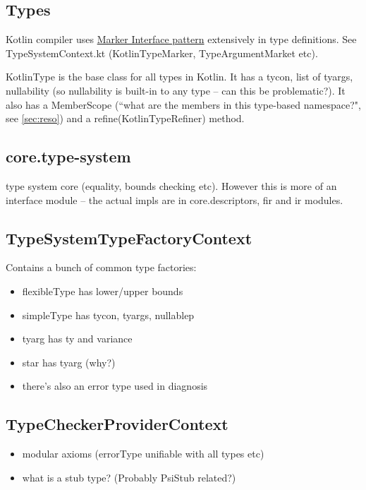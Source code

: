 \documentclass{article}
\begin{document}
\subsection{Types}

Kotlin compiler uses \href{https://en.wikipedia.org/wiki/Marker_interface_pattern}{Marker Interface pattern} extensively in type definitions. See TypeSystemContext.kt (KotlinTypeMarker, TypeArgumentMarket etc).

KotlinType is the base class for all types in Kotlin. It has a tycon, list of tyargs, nullability (so nullability is built-in to any type -- can this be problematic?). It also has a MemberScope (``what are the members in this type-based namespace?", see \ref{sec:reso}) and a refine(KotlinTypeRefiner) method.

\subsection{core.type-system}

type system core (equality, bounds checking etc). However this is more of an interface module -- the actual impls are in core.descriptors, fir and ir modules.

\subsection{TypeSystemTypeFactoryContext}

Contains a bunch of common type factories:

\begin{itemize}
    \item flexibleType has lower/upper bounds
    \item simpleType has tycon, tyargs, nullablep
    \item tyarg has ty and variance
    \item star has tyarg (why?)
    \item there's also an error type used in diagnosis
\end{itemize}

\subsection{TypeCheckerProviderContext}

\begin{itemize}
    \item modular axioms (errorType unifiable with all types etc)
    \item what is a stub type? (Probably PsiStub related?)
\end{itemize}
\end{document}
